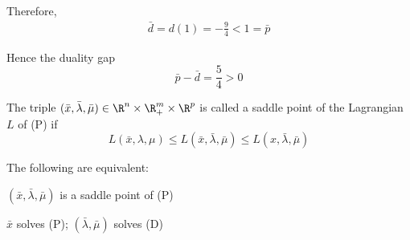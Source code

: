 Therefore,
\begin{align*}
	\bar d=d(1)=-\frac94<1=\bar p
\end{align*}

Hence the duality gap
$$
	\bar p-\bar d=\frac54>0
$$

\label{e1525d8}

The triple $(\bar x,\bar\lambda,\bar\mu)\in\R^n\times\R^m_+\times\R^p$
is called a saddle point of the Lagrangian $L$ of (P) if
$$
	L(\bar x,\lambda,\mu)\leq
	L(\bar x,\bar\lambda,\bar\mu)\leq
	L(x,\bar\lambda,\bar\mu)
$$

\label{dc4af95}

The following are equivalent:
\begin{enumerati}
	\item $(\bar x,\bar\lambda,\bar\mu)$ is a saddle point of (P)
	\item $\bar x$ solves (P); $(\bar\lambda,\bar\mu)$ solves (D)
\end{enumerati}


